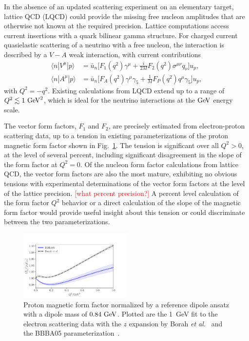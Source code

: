 In the absence of an updated scattering experiment on an elementary target,
 lattice QCD (LQCD) could provide the missing free nucleon amplitudes
 that are otherwise not known at the required precision.
Lattice computations access current insertions with a quark bilinear gamma structure.
For charged current quasielastic scattering of a neutrino with a free nucleon,
 the interaction is described by a $V-A$ weak interaction, with current contributions
\begin{align}
 \langle n | V^\mu | p \rangle
 &= \bar{u}_n \Big[
 F_1(q^2) \gamma^\mu +\frac{i}{2M} F_2(q^2) \sigma^{\mu\nu} q_\nu
 \Big] u_p,
 \nonumber\\
 \langle n | A^\mu | p \rangle
 &= \bar{u}_n \Big[
 F_A(q^2) \gamma^\mu \gamma_5 +\frac{1}{M} F_P(q^2) q^\mu \gamma_5
 \Big] u_p,
\end{align}
 with $Q^2 = -q^2$.
Existing calculations from LQCD extend up to a range of $Q^2 \lesssim 1~{\rm GeV}^2$,
 which is ideal for the neutrino interactions at the ${\rm GeV}$ energy scale.

The vector form factors, $F_1$ and $F_2$,
 are precisely estimated from electron-proton scattering data,
 up to a tension in existing parameterizations of the proton magnetic form factor
 shown in Fig.~\ref{fig:protonmagneticff}.
The tension is significant over all $Q^2 > 0$, at the level of several percent,
 including significant disagreement in the slope of the form factor at $Q^2 = 0$.
Of the nucleon form factor calculations from lattice QCD,
 the vector form factors are also the most mature,
 exhibiting no obvious tensions with experimental determinations
 of the vector form factors at the level of the lattice precision.
\textcolor{red}{[what percent precision?]}
A percent level calculation of the form factor $Q^2$ behavior
 or a direct calculation of the slope of the magnetic form factor
 would provide useful insight about this tension or could discriminate
 between the two parameterizations.

\begin{figure}[hbt!]
 \centering
 \includegraphics[width=0.5\textwidth]{plots/proton_magnetic-standalone.pdf}
\caption{
 Proton magnetic form factor normalized by a reference dipole ansatz
 with a dipole mass of $0.84~{\rm GeV}$.
 Plotted are the 1~GeV fit to the electron scattering data with the $z$ expansion by
 Borah {\it et al.}~\cite{Borah:2020gte}
 and the BBBA05 parameterization~\cite{Bradford:2006yz}.
 \label{fig:protonmagneticff}
}
\end{figure}

